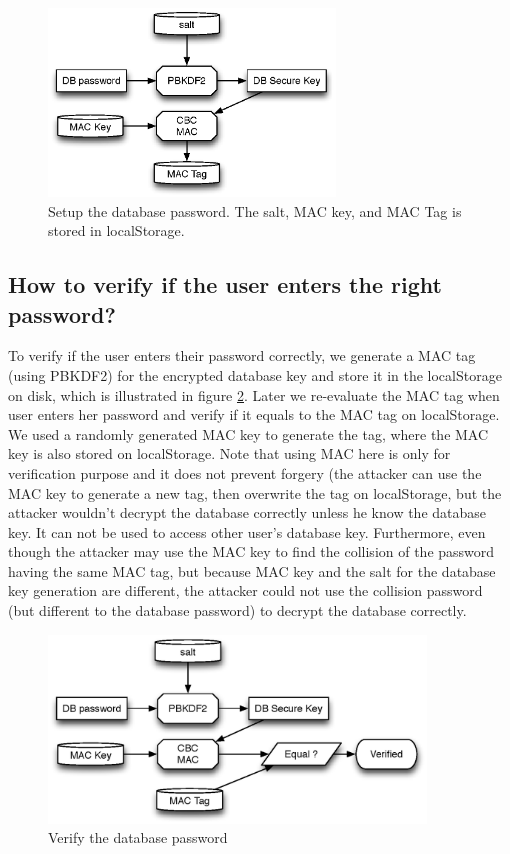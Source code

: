 \begin{figure}[h!]
\centering
\caption{Setup the database password. The salt, MAC key, and MAC Tag is stored in localStorage.}
\label{fig:dbkeys}
\includegraphics[height=5cm]{fig/dbkeys.eps}
\end{figure}

\subsection{How to verify if the user enters the right password?}
\label{sec:verify}
To verify if the user enters their password correctly, we generate a MAC tag (using PBKDF2) for the encrypted database key and store it in the localStorage on disk, which is illustrated in figure \ref{fig:verify_dbkeys}. Later we re-evaluate the MAC tag when user enters her password and verify if it equals to the MAC tag on localStorage. We used a randomly generated MAC key to generate the tag, where the MAC key is also stored on localStorage. Note that using MAC here is only for verification purpose and it does not prevent forgery (the attacker can use the MAC key to generate a new tag, then overwrite the tag on localStorage, but the attacker wouldn't decrypt the database correctly unless he know the database key. It can not be used to access other user's database key. Furthermore, even though the attacker may use the MAC key to find the collision of the password having the same MAC tag, but because MAC key and the salt for the database key generation are different, the attacker could not use the collision password (but different to the database password) to decrypt the database correctly. 
\begin{figure}[h!]
\centering
\caption{Verify the database password}
\label{fig:verify_dbkeys}
\includegraphics[height=5cm]{fig/verify_dbkeys.eps}
\end{figure}

